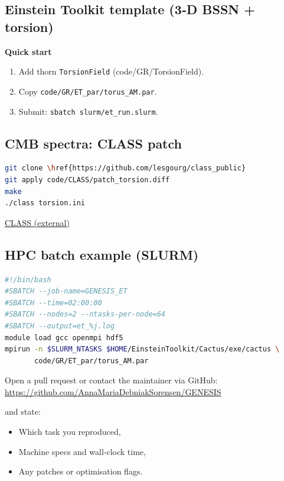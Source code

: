 \documentclass{article}
\begin{document}
\subsection*{Einstein Toolkit template (3‑D BSSN + torsion)}
\textbf{Quick start}
\begin{enumerate}[nosep]
\item Add thorn \texttt{TorsionField} (code/GR/TorsionField).  
\item Copy \texttt{code/GR/ET\_par/torus\_AM.par}.  
\item Submit: \texttt{sbatch slurm/et\_run.slurm}.
\end{enumerate}

\subsection*{CMB spectra: CLASS patch}
\begin{lstlisting}[language=bash,basicstyle=\ttfamily\small]
git clone \href{https://github.com/lesgourg/class_public}
git apply code/CLASS/patch_torsion.diff
make
./class torsion.ini
\end{lstlisting}

\href{https://github.com/lesgourg/class_public}{CLASS (external)}


\subsection*{HPC batch example (SLURM)}
\begin{lstlisting}[language=bash,basicstyle=\ttfamily\small]
#!/bin/bash
#SBATCH --job-name=GENESIS_ET
#SBATCH --time=02:00:00
#SBATCH --nodes=2 --ntasks-per-node=64
#SBATCH --output=et_%j.log
module load gcc openmpi hdf5
mpirun -n $SLURM_NTASKS $HOME/EinsteinToolkit/Cactus/exe/cactus \
       code/GR/ET_par/torus_AM.par
\end{lstlisting}

Open a pull request or contact the maintainer via GitHub:  
\url{https://github.com/AnnaMariaDebniakSorensen/GENESIS}

and state:
\begin{itemize}[nosep]
\item Which task you reproduced,
\item Machine specs and wall‑clock time,
\item Any patches or optimisation flags.
\end{itemize}
\end{document}

